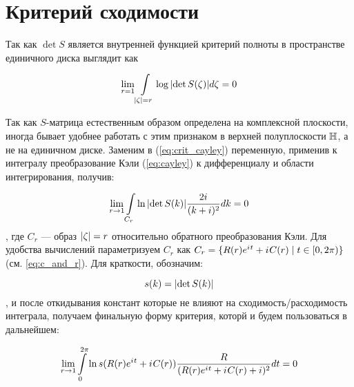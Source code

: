 
\section{Критерий сходимости}

Так как $\det S$ является внутренней функцией критерий полноты в пространстве единичного диска выглядит как

\begin{equation}\label{eq:crit_cayley}
\lim\limits_{r = 1} \int\limits_{\abs{\zeta} = r} \log \abs{\det S(\zeta)} d \zeta = 0
\end{equation}

Так как $S$-матрица естественным образом определена на комплексной плоскости, иногда бывает удобнее работать с этим признаком в верхней полуплоскости $\mathbb{H}$, а не на единичном диске. Заменим в (\ref{eq:crit_cayley}) переменную, применив к интегралу преобразование Кэли (\ref{eq:cayley}) к дифференциалу и области интегрирования, получив:

\begin{equation}\label{eq:crit}
\lim\limits_{r \to 1} \int\limits_{C_r} \ln \abs{\det S(k)} \frac{2 {i\mkern1mu}}{(k + i)^2} dk = 0
\end{equation}
, где $C_r$ — образ $\abs{\zeta} = r$ относительно обратного преобразования Кэли. Для удобства вычислений параметризуем $C_r$ как $C_r = \{R(r) e^{{i\mkern1mu} t} + {i\mkern1mu} C(r) \mid t \in [0, 2 \pi)\}$ (см. \ref{eq:c_and_r}). Для краткости, обозначим:

\[
s(k) = \abs{\det S(k)}
\]
, и после откидывания констант которые не влияют на сходимость/расходимость интеграла, получаем финальную форму критерия, которй и будем пользоваться в дальнейшем:

\begin{equation}\label{eq:critp}
\lim\limits_{r \to 1} \int\limits_{0}^{2 \pi} \ln s(R(r) e^{{i\mkern1mu} t} + {i\mkern1mu} C(r)) \frac{R}{(R(r) e^{{i\mkern1mu} t} + {i\mkern1mu} C(r) + i)^2} dt = 0
\end{equation}


